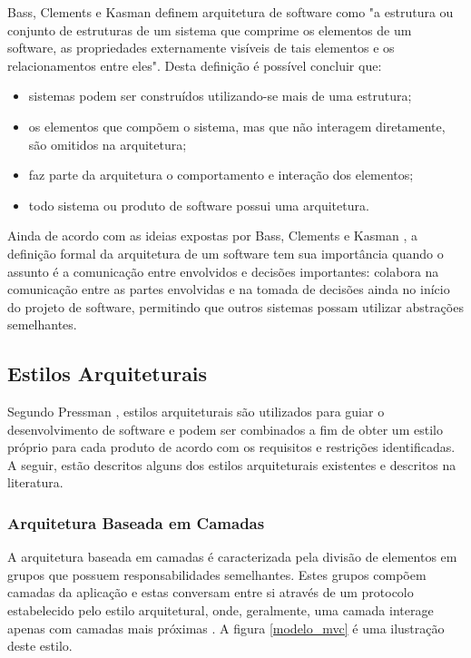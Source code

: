 Bass, Clements e Kasman \cite{bass_software_archi_practice_2003} definem arquitetura de software como "a estrutura ou conjunto de estruturas de um sistema que comprime os elementos de um software, as propriedades externamente visíveis de tais elementos e os relacionamentos entre eles". Desta definição é possível concluir que:
\begin{itemize}
\item sistemas podem ser construídos utilizando-se mais de uma estrutura;
\item os elementos que compõem o sistema, mas que não interagem diretamente, são omitidos na arquitetura;
\item faz parte da arquitetura o comportamento e interação dos elementos;
\item todo sistema ou produto de software possui uma arquitetura.
\end{itemize}

Ainda de acordo com as ideias expostas por Bass, Clements e Kasman \cite{bass_software_archi_practice_2003}, a definição formal da arquitetura de um software tem sua importância quando o assunto é a comunicação entre envolvidos e decisões importantes: colabora na comunicação entre as partes envolvidas e na tomada de decisões ainda no início do projeto de software, permitindo que outros sistemas possam utilizar abstrações semelhantes.

\subsection{Estilos Arquiteturais}
Segundo Pressman \cite{pressman2006engenharia}, estilos arquiteturais são utilizados para guiar o desenvolvimento de software e podem ser combinados a fim de obter um estilo próprio para cada produto de acordo com os requisitos e restrições identificadas. A seguir, estão descritos alguns dos estilos arquiteturais existentes e descritos na literatura.

\subsubsection{Arquitetura Baseada em Camadas}
A arquitetura baseada em camadas é caracterizada pela divisão de elementos em grupos que possuem responsabilidades semelhantes. Estes grupos compõem camadas da aplicação e estas conversam entre si através de um protocolo estabelecido pelo estilo arquitetural, onde, geralmente, uma camada interage apenas com camadas mais próximas \cite{pressman2006engenharia}. A figura \ref{modelo_mvc} é uma ilustração deste estilo.

